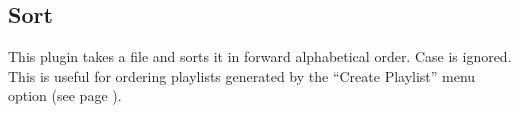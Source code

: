 \subsection{Sort}
This plugin takes a file and sorts it in  forward alphabetical order.  Case is
ignored.  This is useful for ordering playlists generated by the ``Create Playlist'' menu option (see page \pageref{ref:Playlistsubmenu}).


